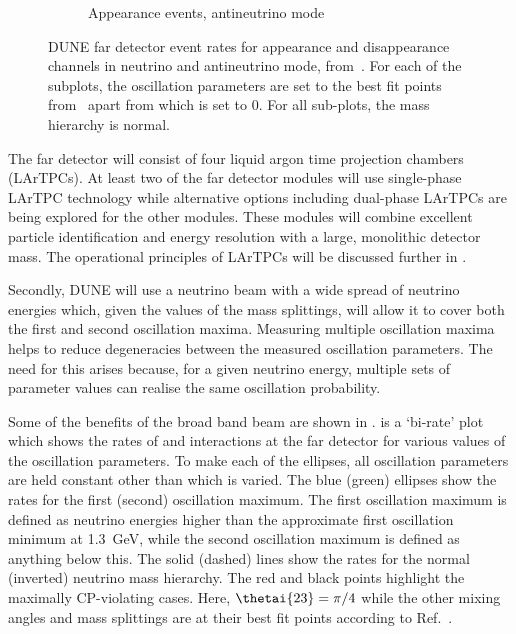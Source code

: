 \begin{figure}[h]
\begin{subfigure}[t]{.49\textwidth}
    \caption{Appearance events, antineutrino mode}
  \end{subfigure}
  \caption[DUNE far detector event rates.]{DUNE far detector event rates for appearance and disappearance channels in neutrino and antineutrino mode, from~\cite{tdrVol2}. For each of the subplots, the oscillation parameters are set to the best fit points from~\cite{nufit4} apart from \dcp which is set to 0. For all sub-plots, the mass hierarchy is normal.}
  \label{fig:fdEventRates}
\end{figure}

The far detector will consist of four liquid argon time projection chambers (LArTPCs).
At least two of the far detector modules will use single-phase LArTPC technology while alternative options including dual-phase LArTPCs are being explored for the other modules.
These modules will combine excellent particle identification and energy resolution with a large, monolithic detector mass. 
The operational principles of LArTPCs will be discussed further in .

Secondly, DUNE will use a neutrino beam with a wide spread of neutrino energies which, given the values of the mass splittings, will allow it to cover both the first and second oscillation maxima.
Measuring multiple oscillation maxima helps to reduce degeneracies between the measured oscillation parameters.
The need for this arises because, for a given neutrino energy, multiple sets of parameter values can realise the same oscillation probability.

Some of the benefits of the broad band beam are shown in .
 is a `bi-rate' plot which shows the rates of \nue and \anue interactions at the far detector for various values of the oscillation parameters.
To make each of the ellipses, all oscillation parameters are held constant other than \dcp which is varied.
The blue (green) ellipses show the rates for the first (second) oscillation maximum.
The first oscillation maximum is defined as neutrino energies higher than the approximate first oscillation minimum at \SI{1.3}{\giga\electronvolt}, while the second oscillation maximum is defined as anything below this.
The solid (dashed) lines show the rates for the normal (inverted) neutrino mass hierarchy.
The red and black points highlight the maximally CP-violating cases.
Here, $\thetai{23}=\pi/4$ while the other mixing angles and mass splittings are at their best fit points according to Ref.~\cite{nufit4}.


